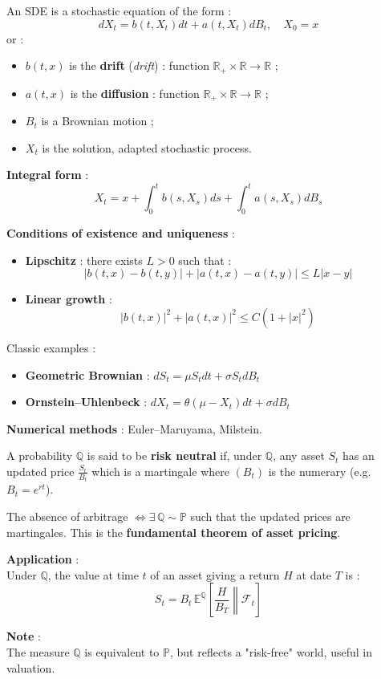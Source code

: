 \begin{f}
	
	An SDE is a stochastic equation of the form :
	\[
	dX_t = b(t, X_t) dt + a(t, X_t) dB_t, \quad X_0 = x
	\]
	or :
	\begin{itemize}
		\item \(b(t,x)\) is the \textbf{drift} (\emph{drift}) : function \(\mathbb{R}_+ \times \mathbb{R} \to \mathbb{R}\) ;
		\item \(a(t,x)\) is the \textbf{diffusion} : function \(\mathbb{R}_+ \times \mathbb{R} \to \mathbb{R}\) ;
		\item \(B_t\) is a Brownian motion ;
		\item \(X_t\) is the solution, adapted stochastic process.
	\end{itemize}
	
	\textbf{Integral form} :
	\[
	X_t = x + \int_0^t b(s, X_s) ds + \int_0^t a(s, X_s) dB_s
	\]
	
	\textbf{Conditions of existence and uniqueness} :
	\begin{itemize}
		\item \textbf{Lipschitz} : there exists \(L > 0\) such that :
		\[
		|b(t,x) - b(t,y)| + |a(t,x) - a(t,y)| \leq L |x - y|
		\]
		\item \textbf{Linear growth} :
		\[
		|b(t,x)|^2 + |a(t,x)|^2 \leq C(1 + |x|^2)
		\]
	\end{itemize}
	
Classic examples :
	\begin{itemize}
		\item \textbf{Geometric Brownian} : \(dS_t = \mu S_t dt + \sigma S_t dB_t\)
		\item \textbf{Ornstein–Uhlenbeck} : \(dX_t = \theta(\mu - X_t) dt + \sigma dB_t\)
	\end{itemize}
	
	\textbf{Numerical methods} : Euler–Maruyama, Milstein.
	
\end{f}

\begin{f}
	
	A probability \(\mathbb{Q}\) is said to be \textbf{risk neutral} if, under \(\mathbb{Q}\), 
	any asset \(S_t\) has an updated price \( \frac{S_t}{B_t}\) which is a martingale
	where \((B_t)\) is the numerary (e.g. \(B_t = e^{rt}\)).
	
	The absence of arbitrage \(\iff \exists\, \mathbb{Q} \sim \mathbb{P}\) such that the updated prices are martingales.
	This is the \textbf{fundamental theorem of asset pricing}.
	
	\textbf{Application} :\\
	Under \(\mathbb{Q}\), the value at time \(t\) of an asset giving a return \(H\) at date \(T\) is :
	\[
	S_t = B_t\, \mathbb{E}^\mathbb{Q} \left[ \left. \frac{H}{B_T} \right\|  \mathcal{F}_t \right]
	\]
	
	\textbf{Note} :\\
	The measure \(\mathbb{Q}\) is equivalent to \(\mathbb{P}\), but reflects a "risk-free" world, useful in valuation.
	
\end{f}
\newcolumn

